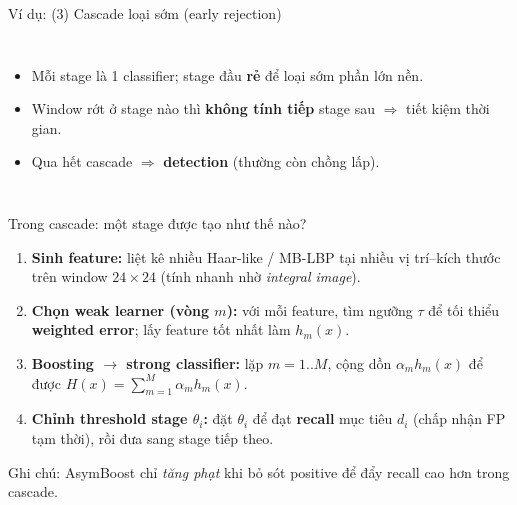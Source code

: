 \documentclass[aspectratio=169,11pt]{beamer}
\begin{document}
\begin{frame}{Ví dụ: (3) Cascade loại sớm (early rejection)}
  \begin{columns}[T,onlytextwidth]
    \centering

    \begin{itemize}
      \setlength{\itemsep}{6pt}
      \item Mỗi stage là 1 classifier; stage đầu \textbf{rẻ} để loại sớm phần lớn nền.
      \item Window rớt ở stage nào thì \textbf{không tính tiếp} stage sau \(\Rightarrow\) tiết kiệm thời gian.
      \item Qua hết cascade \(\Rightarrow\) \textbf{detection} (thường còn chồng lấp).
    \end{itemize}
  \end{columns}
\end{frame}

\begin{frame}{Trong cascade: một stage được tạo như thế nào?}
  \small
  \begin{enumerate}
    \setlength{\itemsep}{6pt}
    \item \textbf{Sinh feature:} liệt kê nhiều Haar-like / MB-LBP tại nhiều vị trí--kích thước trên window \(24\times24\) (tính nhanh nhờ \textit{integral image}).\ \cite{viola2001rapid,viola2004robust}
    \item \textbf{Chọn weak learner (vòng \(m\)):} với mỗi feature, tìm ngưỡng \(\tau\) để tối thiểu \textbf{weighted error}; lấy feature tốt nhất làm \(h_m(x)\).
    \item \textbf{Boosting \(\rightarrow\) strong classifier:} lặp \(m=1..M\), cộng dồn \(\alpha_m h_m(x)\) để được \(H(x)=\sum_{m=1}^{M}\alpha_m h_m(x)\).
    \item \textbf{Chỉnh threshold stage \(\theta_i\):} đặt \(\theta_i\) để đạt \textbf{recall} mục tiêu \(d_i\) (chấp nhận FP tạm thời), rồi đưa sang stage tiếp theo.\ \cite{viola2004robust}
  \end{enumerate}
  \vspace{3pt}
  {\scriptsize Ghi chú: AsymBoost chỉ \textit{tăng phạt} khi bỏ sót positive để đẩy recall cao hơn trong cascade.\ \cite{wu2008asymmetric}}
\end{frame}
\end{document}
